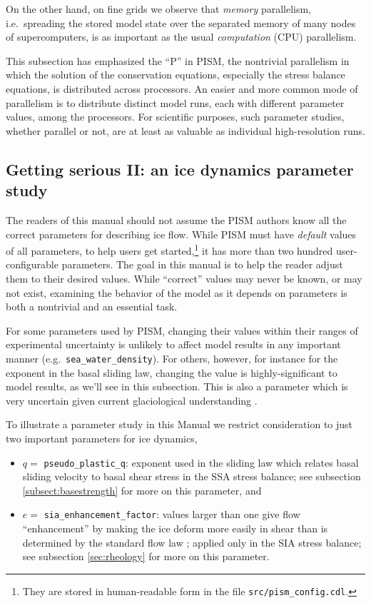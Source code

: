 On the other hand, on fine grids we observe that \emph{memory} parallelism, i.e.~spreading the stored model state over the separated memory of many nodes of supercomputers, is as important as the usual \emph{computation} (CPU) parallelism.

This subsection has emphasized the ``P'' in PISM, the nontrivial parallelism in which the solution of the conservation equations, especially the stress balance equations, is distributed across processors.  An easier and more common mode of parallelism is to distribute distinct model runs, each with different parameter values, among the processors.  For scientific purposes, such parameter studies, whether parallel or not, are at least as valuable as individual high-resolution runs.


\subsection{Getting serious II: an ice dynamics parameter study}  \label{subsect:paramstudy}

The readers of this manual should not assume the PISM authors know all the correct parameters for describing ice flow.  While PISM must have \emph{default} values of all parameters, to help users get started,\footnote{They are stored in human-readable form in the file \texttt{src/pism_config.cdl}.} it has more than two hundred user-configurable parameters.  The goal in this manual is to help the reader adjust them to their desired values.  While ``correct'' values may never be known, or may not exist, examining the behavior of the model as it depends on parameters is both a nontrivial and an essential task.

For some parameters used by PISM, changing their values within their ranges of experimental uncertainty is unlikely to affect model results in any important manner (e.g.~\texttt{sea_water_density}).  For others, however, for instance for the exponent in the basal sliding law, changing the value is highly-significant to model results, as we'll see in this subsection.  This is also a parameter which is very uncertain given current glaciological understanding \cite{CuffeyPaterson}.

To illustrate a parameter study in this Manual we restrict consideration to just two important parameters for ice dynamics,\begin{itemize}
\item $q=$ \texttt{pseudo_plastic_q}: exponent used in the sliding law which relates basal sliding velocity to basal shear stress in the SSA stress balance; see subsection \ref{subsect:basestrength} for more on this parameter, and
\item $e=$ \texttt{sia_enhancement_factor}: values larger than one give flow ``enhancement'' by making the ice deform more easily in shear than is determined by the standard flow law \cite{LliboutryDuval1985,PatersonBudd}; applied only in the SIA stress balance; see subsection \ref{sec:rheology} for more on this parameter.
\end{itemize}

